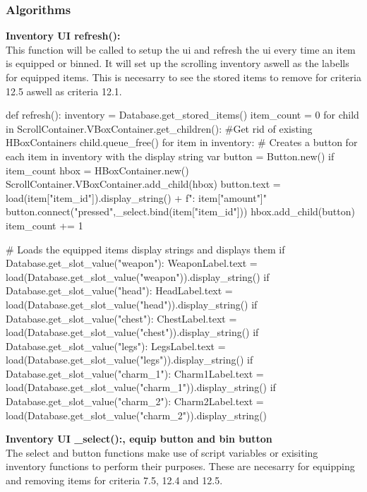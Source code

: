 \documentclass{article}
\begin{document}
        \subsubsection{Algorithms}
        \textbf{Inventory UI refresh():}\\
        This function will be called to setup the ui and refresh the ui every time an item is equipped or binned. It will set up the scrolling inventory aswell as the labells for equipped items. This is necesarry to see the stored items to remove for criteria 12.5 aswell as criteria 12.1.\\
        \begin{python}
def refresh():
   inventory = Database.get_stored_items()
   item_count = 0
   for child in ScrollContainer.VBoxContainer.get_children(): #Get rid of existing HBoxContainers
      child.queue_free()
   for item in inventory: # Creates a button for each item in inventory with the display string
      var button = Button.new()
      if item_count %
         hbox = HBoxContainer.new()
         ScrollContainer.VBoxContainer.add_child(hbox)
      button.text = load(item["item_id"]).display_string() + f"\nAmount: {item["amount"]}"
      button.connect("pressed",_select.bind(item["item_id"]))
      hbox.add_child(button)
      item_count += 1
                        
   # Loads the equipped items display strings and displays them
   if Database.get_slot_value("weapon"):
      WeaponLabel.text = load(Database.get_slot_value("weapon")).display_string()
   if Database.get_slot_value("head"):
      HeadLabel.text = load(Database.get_slot_value("head")).display_string()
   if Database.get_slot_value("chest"):
      ChestLabel.text = load(Database.get_slot_value("chest")).display_string()
   if Database.get_slot_value("legs"):
      LegsLabel.text = load(Database.get_slot_value("legs")).display_string()
   if Database.get_slot_value("charm_1"):
      Charm1Label.text = load(Database.get_slot_value("charm_1")).display_string()
   if Database.get_slot_value("charm_2"):
      Charm2Label.text = load(Database.get_slot_value("charm_2")).display_string()
        \end{python}
        \textbf{Inventory UI \_select():, equip button and bin button}\\
        The select and button functions make use of script variables or exisiting inventory functions to perform their purposes. These are necesarry for equipping and removing items for criteria 7.5, 12.4 and 12.5.\\
\end{document}
